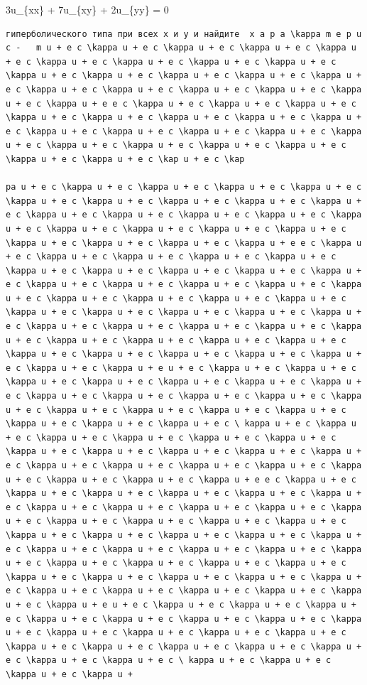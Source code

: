 \documentclass[
  ukrainian,
]{article}
\begin{document}
3u\_\{xx\} + 7u\_\{xy\} + 2u\_\{yy\} = 0

\begin{verbatim}
гиперболического типа при всех x и y и найдите  x a p a \kappa m e p u c -   m u + e c \kappa u + e c \kappa u + e c \kappa u + e c \kappa u + e c \kappa u + e c \kappa u + e c \kappa u + e c \kappa u + e c \kappa u + e c \kappa u + e c \kappa u + e c \kappa u + e c \kappa u + e c \kappa u + e c \kappa u + e c \kappa u + e c \kappa u + e c \kappa u + e c \kappa u + e e c \kappa u + e c \kappa u + e c \kappa u + e c \kappa u + e c \kappa u + e c \kappa u + e c \kappa u + e c \kappa u + e c \kappa u + e c \kappa u + e c \kappa u + e c \kappa u + e c \kappa u + e c \kappa u + e c \kappa u + e c \kappa u + e c \kappa u + e c \kappa u + e c \kappa u + e c \kap u + e c \kap

pa u + e c \kappa u + e c \kappa u + e c \kappa u + e c \kappa u + e c \kappa u + e c \kappa u + e c \kappa u + e c \kappa u + e c \kappa u + e c \kappa u + e c \kappa u + e c \kappa u + e c \kappa u + e c \kappa u + e c \kappa u + e c \kappa u + e c \kappa u + e c \kappa u + e c \kappa u + e c \kappa u + e c \kappa u + e c \kappa u + e e c \kappa u + e c \kappa u + e c \kappa u + e c \kappa u + e c \kappa u + e c \kappa u + e c \kappa u + e c \kappa u + e c \kappa u + e c \kappa u + e c \kappa u + e c \kappa u + e c \kappa u + e c \kappa u + e c \kappa u + e c \kappa u + e c \kappa u + e c \kappa u + e c \kappa u + e c \kappa u + e c \kappa u + e c \kappa u + e c \kappa u + e c \kappa u + e c \kappa u + e c \kappa u + e c \kappa u + e c \kappa u + e c \kappa u + e c \kappa u + e c \kappa u + e c \kappa u + e c \kappa u + e c \kappa u + e c \kappa u + e c \kappa u + e c \kappa u + e c \kappa u + e c \kappa u + e c \kappa u + e u + e c \kappa u + e c \kappa u + e c \kappa u + e c \kappa u + e c \kappa u + e c \kappa u + e c \kappa u + e c \kappa u + e c \kappa u + e c \kappa u + e c \kappa u + e c \kappa u + e c \kappa u + e c \kappa u + e c \kappa u + e c \kappa u + e c \kappa u + e c \kappa u + e c \kappa u + e c \ kappa u + e c \kappa u + e c \kappa u + e c \kappa u + e c \kappa u + e c \kappa u + e c \kappa u + e c \kappa u + e c \kappa u + e c \kappa u + e c \kappa u + e c \kappa u + e c \kappa u + e c \kappa u + e c \kappa u + e c \kappa u + e c \kappa u + e c \kappa u + e c \kappa u + e e c \kappa u + e c \kappa u + e c \kappa u + e c \kappa u + e c \kappa u + e c \kappa u + e c \kappa u + e c \kappa u + e c \kappa u + e c \kappa u + e c \kappa u + e c \kappa u + e c \kappa u + e c \kappa u + e c \kappa u + e c \kappa u + e c \kappa u + e c \kappa u + e c \kappa u + e c \kappa u + e c \kappa u + e c \kappa u + e c \kappa u + e c \kappa u + e c \kappa u + e c \kappa u + e c \kappa u + e c \kappa u + e c \kappa u + e c \kappa u + e c \kappa u + e c \kappa u + e c \kappa u + e c \kappa u + e c \kappa u + e c \kappa u + e c \kappa u + e c \kappa u + e c \kappa u + e c \kappa u + e u + e c \kappa u + e c \kappa u + e c \kappa u + e c \kappa u + e c \kappa u + e c \kappa u + e c \kappa u + e c \kappa u + e c \kappa u + e c \kappa u + e c \kappa u + e c \kappa u + e c \kappa u + e c \kappa u + e c \kappa u + e c \kappa u + e c \kappa u + e c \kappa u + e c \kappa u + e c \ kappa u + e c \kappa u + e c \kappa u + e c \kappa u + 
\end{verbatim}
\end{document}
